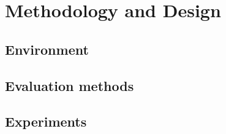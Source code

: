 
\section{Methodology and Design}

\subsection{Environment} 

\subsection{Evaluation methods} 

\subsection{Experiments}  
